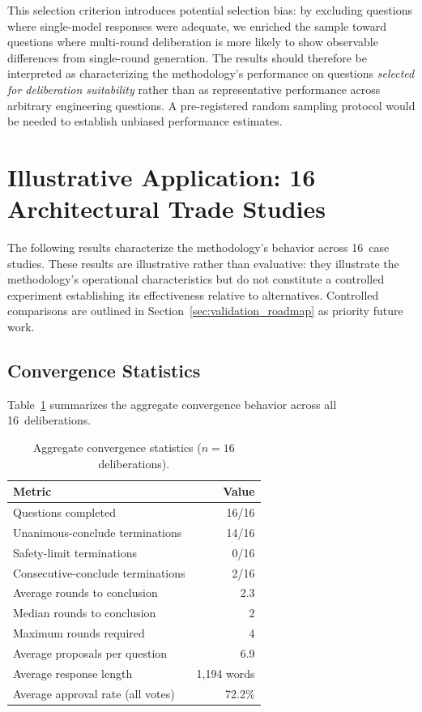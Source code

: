 \documentclass[11pt,a4paper]{article}
\begin{document}
This selection criterion introduces potential selection bias: by excluding questions where single-model responses were adequate, we enriched the sample toward questions where multi-round deliberation is more likely to show observable differences from single-round generation. The results should therefore be interpreted as characterizing the methodology's performance on questions \emph{selected for deliberation suitability} rather than as representative performance across arbitrary engineering questions. A pre-registered random sampling protocol would be needed to establish unbiased performance estimates.

\section{Illustrative Application: 16 Architectural Trade Studies}
\label{sec:results}

The following results characterize the methodology's behavior across 16~case studies. These results are illustrative rather than evaluative: they illustrate the methodology's operational characteristics but do not constitute a controlled experiment establishing its effectiveness relative to alternatives. Controlled comparisons are outlined in Section~\ref{sec:validation_roadmap} as priority future work.

\subsection{Convergence Statistics}

Table~\ref{tab:convergence} summarizes the aggregate convergence behavior across all 16~deliberations.

\begin{table}[ht]
\centering
\caption{Aggregate convergence statistics ($n = 16$ deliberations).}
\label{tab:convergence}
\begin{tabular}{@{}lr@{}}
\toprule
\textbf{Metric} & \textbf{Value} \\
\midrule
Questions completed & 16/16 \\
Unanimous-conclude terminations & 14/16 \\
Safety-limit terminations & 0/16 \\
Consecutive-conclude terminations & 2/16 \\
Average rounds to conclusion & 2.3 \\
Median rounds to conclusion & 2 \\
Maximum rounds required & 4 \\
Average proposals per question & 6.9 \\
Average response length & 1{,}194 words \\
Average approval rate (all votes) & 72.2\% \\
\bottomrule
\end{tabular}
\end{table}
\end{document}
